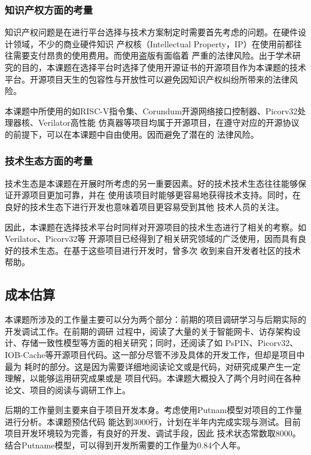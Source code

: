\subsubsection{知识产权方面的考量}

知识产权问题是在进行平台选择与技术方案制定时需要首先考虑的问题。在硬件设计领域，不少的商业硬件知识
产权核（Intellectual Property，IP）在使用前都往往需要支付昂贵的使用费用。而使用盗版有面临着
严重的法律风险。出于学术研究的目的，本课题在选择平台时选择了使用开源证书的开源项目作为本课题的技术
平台。开源项目天生的包容性与开放性可以避免因知识产权纠纷所带来的法律风险。

本课题中所使用的如RISC-V指令集、Corundum开源网络接口控制器、Picorv32处理器核、Verilator高性能
仿真器等项目均属于开源项目，在遵守对应的开源协议的前提下，可以在本课题中自由使用。因而避免了潜在的
法律风险。

\subsubsection{技术生态方面的考量}

技术生态是本课题在开展时所考虑的另一重要因素。好的技术技术生态往往能够保证开源项目更加可靠，并在
使用该项目时能够更容易地获得技术支持。同时，在良好的技术生态下进行开发也意味着项目更容易受到其他
技术人员的关注。

因此，本课题在选择技术平台时同样对开源项目的技术生态进行了相关的考察。如Verilator、Picorv32等
开源项目已经得到了相关研究领域的广泛使用，因而具有良好的技术生态。在基于这些项目进行开发时，曾多次
收到来自开发者社区的技术帮助。

\subsection{成本估算}


本课题所涉及的工作量主要可以分为两个部分：前期的项目调研学习与后期实际的开发调试工作。在前期的调研
过程中，阅读了大量的关于智能网卡、访存架构设计、存储一致性模型等方面的相关研究；同时，还阅读了如
PsPIN、Picorv32、IOB-Cache等开源项目代码。这一部分尽管不涉及具体的开发工作，但却是项目中最为
耗时的部分。这是因为需要详细地阅读论文或是代码，对研究成果产生一定理解，以能够运用研究成果或是
项目代码。本课题大概投入了两个月时间在各种论文、项目的阅读与调研工作上。

后期的工作量则主要来自于项目开发本身。考虑使用Putnam模型对项目的工作量进行分析。本课题预估代码
能达到3000行，计划在半年内完成实现与测试。目前项目开发环境较为完善，有良好的开发、调试手段，因此
技术状态常数取8000。结合Putname模型，可以得到开发所需要的工作量为0.84个人年。

